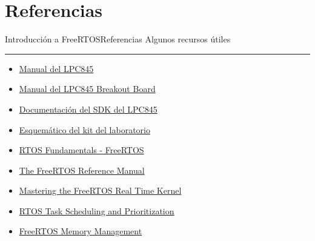 \documentclass[aspectratio=169, xcolor=dvipsnames]{beamer}
\begin{document}
\section{Referencias}
\begin{frame}{Introducción a FreeRTOS}{Referencias}
    Algunos recursos útiles
    \noindent\rule{\textwidth}{0.75pt}
    \begin{multicols}{2}
    \begin{itemize}
        \item \href{https://github.com/utn-fra-lse/lpc845/blob/main/docs/UM11029.pdf}{Manual del LPC845}
        \item \href{https://github.com/utn-fra-lse/lpc845/blob/main/docs/UM11181.pdf}{Manual del LPC845 Breakout Board}
        \item \href{https://mcuxpresso.nxp.com/api_doc/dev/116/modules.html}{Documentación del SDK del LPC845}
        \item \href{https://github.com/utn-fra-lse/lpc845/blob/main/docs/BASE_KIT_V0.pdf}{Esquemático del kit del laboratorio}
        \item \href{https://www.freertos.org/Documentation/01-FreeRTOS-quick-start/01-Beginners-guide/01-RTOS-fundamentals}{RTOS Fundamentals - FreeRTOS}
        \item \href{https://www.freertos.org/media/2018/FreeRTOS_Reference_Manual_V10.0.0.pdf}{The FreeRTOS Reference Manual}
        \item \href{https://github.com/FreeRTOS/FreeRTOS-Kernel-Book/releases/download/V1.0/Mastering-the-FreeRTOS-Real-Time-Kernel.v1.0.pdf}{Mastering the FreeRTOS Real Time Kernel}
        \item \href{https://www.digikey.ee/en/maker/projects/introduction-to-rtos-solution-to-part-3-task-scheduling/8fbb9e0b0eed4279a2dd698f02ce125f}{RTOS Task Scheduling and Prioritization}
        \item \href{https://www.digikey.com/en/maker/projects/introduction-to-rtos-solution-to-part-4-memory-management/6d4dfcaa1ff84f57a2098da8e6401d9c}{FreeRTOS Memory Management}
    \end{itemize}
    \end{multicols}
\end{frame}
\end{document}
